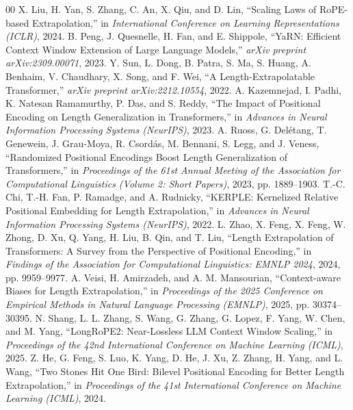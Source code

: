 \documentclass[conference]{IEEEtran}
\begin{document}
\begin{thebibliography}{00}
 X. Liu, H. Yan, S. Zhang, C. An, X. Qiu, and D. Lin, ``Scaling Laws of RoPE-based Extrapolation,'' in \emph{International Conference on Learning Representations (ICLR)}, 2024.
 B. Peng, J. Quesnelle, H. Fan, and E. Shippole, ``YaRN: Efficient Context Window Extension of Large Language Models,'' \emph{arXiv preprint arXiv:2309.00071}, 2023.
 Y. Sun, L. Dong, B. Patra, S. Ma, S. Huang, A. Benhaim, V. Chaudhary, X. Song, and F. Wei, ``A Length-Extrapolatable Transformer,'' \emph{arXiv preprint arXiv:2212.10554}, 2022.
 A. Kazemnejad, I. Padhi, K. Natesan Ramamurthy, P. Das, and S. Reddy, ``The Impact of Positional Encoding on Length Generalization in Transformers,'' in \emph{Advances in Neural Information Processing Systems (NeurIPS)}, 2023.
 A. Ruoss, G. Del\'{e}tang, T. Genewein, J. Grau-Moya, R. Csord\'{a}s, M. Bennani, S. Legg, and J. Veness, ``Randomized Positional Encodings Boost Length Generalization of Transformers,'' in \emph{Proceedings of the 61st Annual Meeting of the Association for Computational Linguistics (Volume 2: Short Papers)}, 2023, pp. 1889--1903.
 T.-C. Chi, T.-H. Fan, P. Ramadge, and A. Rudnicky, ``KERPLE: Kernelized Relative Positional Embedding for Length Extrapolation,'' in \emph{Advances in Neural Information Processing Systems (NeurIPS)}, 2022.
 L. Zhao, X. Feng, X. Feng, W. Zhong, D. Xu, Q. Yang, H. Liu, B. Qin, and T. Liu, ``Length Extrapolation of Transformers: A Survey from the Perspective of Positional Encoding,'' in \emph{Findings of the Association for Computational Linguistics: EMNLP 2024}, 2024, pp. 9959--9977.
 A. Veisi, H. Amirzadeh, and A. M. Mansourian, ``Context-aware Biases for Length Extrapolation,'' in \emph{Proceedings of the 2025 Conference on Empirical Methods in Natural Language Processing (EMNLP)}, 2025, pp. 30374--30395.
 N. Shang, L. L. Zhang, S. Wang, G. Zhang, G. Lopez, F. Yang, W. Chen, and M. Yang, ``LongRoPE2: Near-Lossless LLM Context Window Scaling,'' in \emph{Proceedings of the 42nd International Conference on Machine Learning (ICML)}, 2025.
 Z. He, G. Feng, S. Luo, K. Yang, D. He, J. Xu, Z. Zhang, H. Yang, and L. Wang, ``Two Stones Hit One Bird: Bilevel Positional Encoding for Better Length Extrapolation,'' in \emph{Proceedings of the 41st International Conference on Machine Learning (ICML)}, 2024.
\end{thebibliography}
\end{document}
